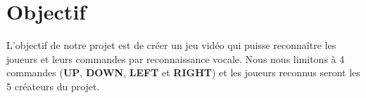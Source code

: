 \section{Objectif}
\label{sec:objectif}

L'objectif de notre projet est de créer un jeu vidéo qui puisse reconnaître les joueurs et leurs commandes par reconnaissance vocale. Nous nous limitons à 4 commandes (\textbf{UP}, \textbf{DOWN}, \textbf{LEFT} et \textbf{RIGHT}) et les joueurs reconnus seront les 5 créateurs du projet.
